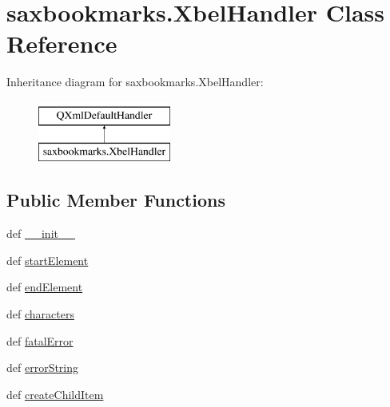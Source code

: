 \hypertarget{classsaxbookmarks_1_1XbelHandler}{}\section{saxbookmarks.\+Xbel\+Handler Class Reference}
\label{classsaxbookmarks_1_1XbelHandler}
Inheritance diagram for saxbookmarks.\+Xbel\+Handler\+:\begin{figure}[H]
\begin{center}
\leavevmode
\includegraphics[height=2.000000cm]{classsaxbookmarks_1_1XbelHandler}
\end{center}
\end{figure}
\subsection*{Public Member Functions}
\begin{DoxyCompactItemize}
\item 
def \hyperlink{classsaxbookmarks_1_1XbelHandler_a53ebea2ba3098034ab3626e95fee57cf}{\+\_\+\+\_\+init\+\_\+\+\_\+}
\item 
def \hyperlink{classsaxbookmarks_1_1XbelHandler_a543dfaadfd37662e5e57f9da216e7df3}{start\+Element}
\item 
def \hyperlink{classsaxbookmarks_1_1XbelHandler_abd3e8eade3ff60dd209b32cd82621518}{end\+Element}
\item 
def \hyperlink{classsaxbookmarks_1_1XbelHandler_a5321939c4445af409de6fff3460480d9}{characters}
\item 
def \hyperlink{classsaxbookmarks_1_1XbelHandler_a0b933af0f7e83a6b011352b743b5b29c}{fatal\+Error}
\item 
def \hyperlink{classsaxbookmarks_1_1XbelHandler_ac00df7b1190b3a102b9bbc32129e0c34}{error\+String}
\item 
def \hyperlink{classsaxbookmarks_1_1XbelHandler_a206cf4e20a70ec3ffbdbf3889fd3bc43}{create\+Child\+Item}
\end{DoxyCompactItemize}
